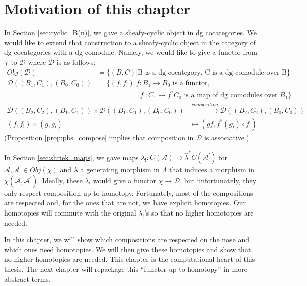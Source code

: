 \section{Motivation of this chapter}
In Section \ref{sec:cyclic_B(n)}, we gave a 
sheafy-cyclic object in dg cocategories. 
We would like to extend that construction 
to a sheafy-cyclic object in the 
category of dg cocategories with a dg 
comodule. Namely, we would like to give 
a functor from $\chi$ to $\mathcal{D}$ 
where $\mathcal{D}$ is as follows:
\begin{align*}
Obj(\mathcal{D}) 
&= 
\{(B,C) |
  \textrm{B is a dg cocategory, 
  C is a dg comodule over B}\} \\
\mathcal{D}((B_1, C_1), (B_0, C_0))  
&= 
\{(f, f_!) | f:B_1 \to B_0 
  \textrm{ is a functor,}\\
& \phantom{{}=[(f, f_!)]{}}  
  f_!:C_1 \to f^*C_0 
  \textrm{ is a map of dg comodules over }
  B_1\}
\end{align*}
\begin{align*}  
\mathcal{D}((B_2, C_2), (B_1, C_1)) \times  
\mathcal{D}((B_1, C_1), (B_0, C_0))
&\xrightarrow{composition}
\mathcal{D}((B_2, C_2), (B_0, C_0))\\
(f,f_!) \times (g, g_!)
&\mapsto
(gf, f^*(g_!)\circ f_!)
\end{align*}
(Proposition \ref{prop:pbs_compose} implies 
that composition in $\mathcal{D}$ is 
associative.)

In Section \ref{sec:shriek_maps}, we 
gave maps $\lambda_!: C(\mathcal{A}) 
\to \hat{\lambda}^*C(\mathcal{A}^\prime)$ 
for $\mathcal{A}, \mathcal{A}^\prime \in 
Obj(\chi)$ and $\lambda$ a generating 
morphism in $\Lambda$ that induces a 
morphism in $\chi(\mathcal{A}, 
\mathcal{A}^\prime)$. Ideally, these 
$\lambda_!$ would give a functor 
$\chi \to \mathcal{D}$, but 
unfortunately, they only respect 
composition up to homotopy. Fortunately, 
most of the compositions are respected 
and, for the ones that are not, we 
have explicit homotopies. Our homotopies 
will commute with the original 
$\lambda_!$'s so that no higher homotopies 
are needed.

In this chapter, we will show which compositions 
are respected on the nose and which ones 
need homotopies. We will then give these homotopies 
and show that no higher homotopies are 
needed. This chapter is the computational 
heart of this thesis. The next chapter will 
repackage this ``functor up to homotopy'' 
in more abstract terms.